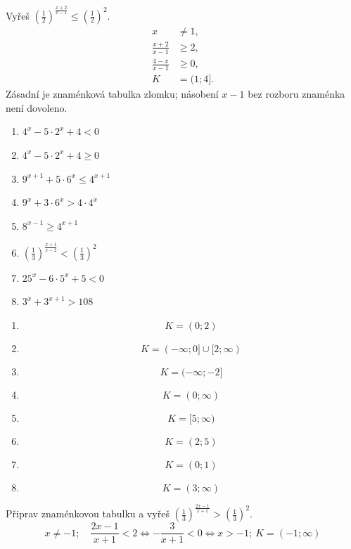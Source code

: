 \documentclass[11pt,a4paper]{article}
\begin{document}
\begin{prikladReseniBox}[title={Příklad 4}]
Vyřeš $\left(\frac12\right)^{\frac{x+2}{x-1}}\le\left(\frac12\right)^2$.
\tcblower
\[
\begin{aligned}x&\ne1,\\\frac{x+2}{x-1}&\ge2,\\\frac{4-x}{x-1}&\ge0,\\K&=(1;4].\end{aligned}
\]
Zásadní je znaménková tabulka zlomku; násobení $x-1$ bez rozboru znaménka není dovoleno.
\end{prikladReseniBox}
\begin{zadaniReseniBox}[title={Samostatná práce 1}]
\begin{enumerate}[label=\alph*)]
\item $4^x-5\cdot2^x+4<0$
\item $4^x-5\cdot2^x+4\ge0$
\item $9^{x+1}+5\cdot6^x\le4^{x+1}$
\item $9^x+3\cdot6^x>4\cdot4^x$
\item $8^{x-1}\ge4^{x+1}$
\item $\left(\frac13\right)^{\frac{x+1}{x-2}}<\left(\frac13\right)^2$
\item $25^x-6\cdot5^x+5<0$
\item $3^x+3^{x+1}>108$
\end{enumerate}
\tcblower
\begin{enumerate}[label=\alph*)]
\item \[
K=(0;2)
\]
\item \[
K=(-\infty;0]\cup[2;\infty)
\]
\item \[
K=(-\infty;-2]
\]
\item \[
K=(0;\infty)
\]
\item \[
K=[5;\infty)
\]
\item \[K=(2;5)\]
\item \[
K=(0;1)
\]
\item \[
K=(3;\infty)
\]
\end{enumerate}
\end{zadaniReseniBox}
\begin{zadaniReseniBox}[title={Rozšíření 1}]
Připrav znaménkovou tabulku a vyřeš $\left(\frac13\right)^{\frac{2x-1}{x+1}}>\left(\frac13\right)^2$.
\tcblower
\[
x\ne-1;\quad \frac{2x-1}{x+1}<2\iff -\frac3{x+1}<0\iff x>-1;\ K=(-1;\infty)
\]
\end{zadaniReseniBox}
\end{document}
